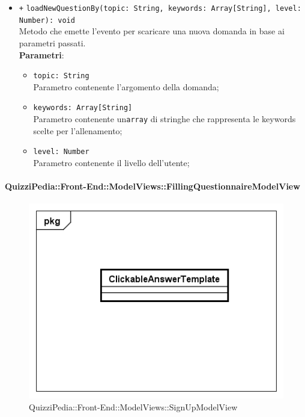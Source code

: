 \begin{itemize}
\begin{itemize}
\begin{itemize}
			\end{itemize}
			\item \texttt{+} \texttt{loadNewQuestionBy(topic: String, keywords: Array[String], level: Number): void} \\
			Metodo che emette l'evento per scaricare una nuova domanda in base ai parametri passati. \\
			\textbf{Parametri}:
			\begin{itemize}
				\item \texttt{topic: String} \\
				Parametro contenente l'argomento della domanda;
				\item \texttt{keywords: Array[String]} \\
				Parametro contenente un\texttt{array} di stringhe che rappresenta le keywords scelte per l'allenamento;
				\item \texttt{level: Number} \\
				Parametro contenente il livello dell'utente;
			\end{itemize}
		\end{itemize}
	\end{itemize}
	
	\paragraph{QuizziPedia::Front-End::ModelViews::FillingQuestionnaireModelView}
	
	\label{QuizziPedia::Front-End::ModelViews::FillingQuestionnaireModelView}
	
	\begin{figure}[ht]
		\centering
		\includegraphics[scale=0.5,keepaspectratio]{UML/Classi/Front-End/QuizziPedia_Front-end_Templates_ClickableAnswerTemplate.png}
		\caption{QuizziPedia::Front-End::ModelViews::SignUpModelView}
	\end{figure} \FloatBarrier
	
